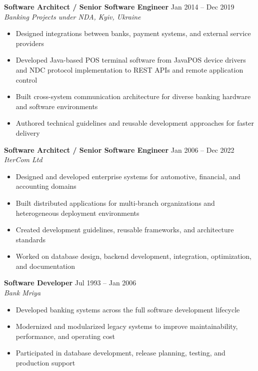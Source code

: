 \documentclass[10pt,a4paper]{article}
\begin{document}
\textbf{Software Architect / Senior Software Engineer} \hfill Jan 2014 -- Dec 2019 \\
\textit{Banking Projects under NDA, Kyiv, Ukraine}

\begin{itemize}
\item Designed integrations between banks, payment systems, and external service providers
\item Developed Java-based POS terminal software from JavaPOS device drivers and NDC protocol implementation to REST APIs and remote application control
\item Built cross-system communication architecture for diverse banking hardware and software environments
\item Authored technical guidelines and reusable development approaches for faster delivery
\end{itemize}

\textbf{Software Architect / Senior Software Engineer} \hfill Jan 2006 -- Dec 2022 \\
\textit{IterCom Ltd}

\begin{itemize}
\item Designed and developed enterprise systems for automotive, financial, and accounting domains
\item Built distributed applications for multi-branch organizations and heterogeneous deployment environments
\item Created development guidelines, reusable frameworks, and architecture standards
\item Worked on database design, backend development, integration, optimization, and documentation
\end{itemize}

\textbf{Software Developer} \hfill Jul 1993 -- Jan 2006 \\
\textit{Bank Mriya}

\begin{itemize}
\item Developed banking systems across the full software development lifecycle
\item Modernized and modularized legacy systems to improve maintainability, performance, and operating cost
\item Participated in database development, release planning, testing, and production support
\end{itemize}

\end{document}
